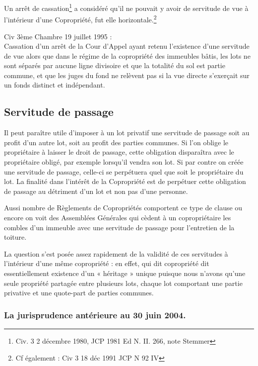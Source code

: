 		Un arrêt de cassation\footnote{Civ. 3\degre{} 2 décembre 1980, JCP 1981 Ed N. II. 266, note Stemmer} a considéré qu'il ne pouvait y avoir de servitude de vue à l'intérieur d'une
		Copropriété, fut elle horizontale.\footnote{Cf également : Civ 3\degre{} 18 déc 1991 JCP N 92 IV }
		
		Civ 3ème Chambre 19 juillet 1995 : \\
		Cassation d’un arrêt de la Cour d’Appel ayant retenu l’existence d’une servitude de vue alors que
		dans le régime de la copropriété des immeubles bâtis, les lots ne sont séparés par aucune ligne
		divisoire et que la totalité du sol est partie commune, et que les juges du fond ne relèvent pas si la
		vue directe s'exerçait sur un fonds distinct et indépendant.
	
	\subsection{Servitude de passage}
		
		Il peut paraître utile d'imposer à un lot privatif une servitude de passage soit au profit d'un autre lot, soit
		au profit des parties communes. Si l'on oblige le propriétaire à laisser le droit de passage, cette obligation
		disparaîtra avec le propriétaire obligé, par exemple lorsqu'il vendra son lot. Si par contre on créée une
		servitude de passage, celle-ci se perpétuera quel que soit le propriétaire du lot. La finalité dans l'intérêt de
		la Copropriété est de perpétuer cette obligation de passage au détriment d'un lot et non pas d'une
		personne.
		
		Aussi nombre de Règlements de Copropriétés comportent ce type de clause ou encore on voit des
		Assemblées Générales qui cèdent à un copropriétaire les combles d'un immeuble avec une servitude de
		passage pour l'entretien de la toiture.
		
		La question s'est posée assez rapidement de la validité de ces servitudes à l'intérieur d'une même
		copropriété : en effet, qui dit copropriété dit essentiellement existence d'un « héritage » unique puisque
		nous n'avons qu'une seule propriété partagée entre plusieurs lots, chaque lot comportant une partie
		privative et une quote-part de parties communes.
		
		\subsubsection{La jurisprudence antérieure au 30 juin 2004.}
		
